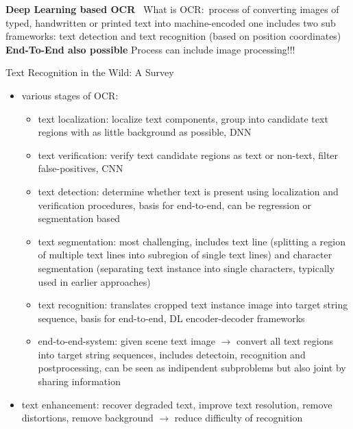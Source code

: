\textbf{Deep Learning based OCR}~\citep{zhao_improving_2020}
What is OCR:\ process of converting images of typed, handwritten or printed text into machine-encoded one
includes two sub frameworks: text detection and text recognition (based on position coordinates)
\textbf{End-To-End also possible}
Process can include image processing!!!

Text Recognition in the Wild: A Survey~\citep{chen_text_2021}
\begin{itemize}
    \item various stages of \ac{OCR}:
        \begin{itemize}
            \item text localization: localize text components, group into candidate text regions with
                as little background as possible, DNN
            \item text verification: verify text candidate regions as text or non-text,
                filter false-positives, CNN
            \item text detection: determine whether text is present using localization and verification
                procedures, basis for end-to-end, can be regression or segmentation based
            \item text segmentation: most challenging, includes text line (splitting a region of multiple
                text lines into subregion of single text lines) and character segmentation (separating
                text instance into single characters, typically used in earlier approaches)
            \item text recognition: translates cropped text instance image into target string sequence,
                basis for end-to-end, DL encoder-decoder frameworks
            \item end-to-end-system: given scene text image $\rightarrow$ convert all text regions into
                target string sequences, includes detectoin, recognition and postprocessing, can be
                seen as indipendent subproblems but also joint by sharing information
        \end{itemize}
    \item text enhancement: recover degraded text, improve text resolution, remove distortions,
        remove background $\rightarrow$ reduce difficulty of recognition
\end{itemize}

